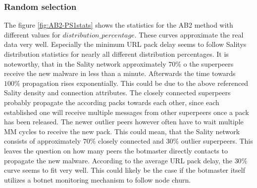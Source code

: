 \documentclass{article}
\begin{document}
\subsubsection*{Random selection}
The figure \ref{fig:AB2-PS1stats} shows the statistics for the AB2 method with different values for $distribution\_percentage$. These curves approximate the real data very well. Especially the minimum URL pack delay seems to follow Salitys distribution statistics for nearly all different distribution percentages. It is noteworthy, that in the Sality network approximately $70\%$ o the superpeers receive the new malware in less than a minute. Afterwards the time towards $100\%$ propagation rises exponentially. This could be due to the above referenced Sality density and connection attributes. The closely connected superpeers probably propagate the according packs towards each other, since each established one will receive multiple messages from other superpeers once a pack has been released. The newer outlier peers however often have to wait multiple MM cycles to receive the new pack. This could mean, that the Sality network consists of approximately $70\%$ closely connected and $30\%$ outlier superpeers. This leaves the question on how many peers the botmaster directly contacts to propagate the new malware. According to the average URL pack delay, the $30\%$ curve seems to fit very well. This could likely be the case if the botmaster itself utilizes a botnet monitoring mechanism to follow node churn. 
\end{document}
